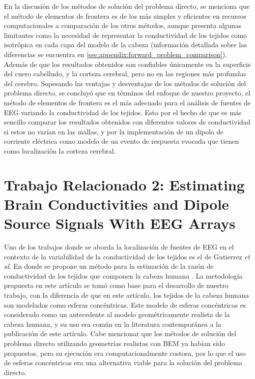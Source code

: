 En la discusión de los métodos de solución del problema directo, se menciona que el método de elementos de frontera es de los más simples y eficientes en recursos computacionales a comparación de los otros métodos, aunque presenta algunas limitantes como la necesidad de representar la conductividad de los tejidos como isotrópica en cada capa del modelo de la cabeza (información detallada sobre las diferencias se encuentra en \cref{sec:appendix:forward_problem_comparison}). Además de que los resultados obtenidos son confiables únicamente en la superficie del cuero cabelludo, y la corteza cerebral, pero no en las regiones más profundas del cerebro. Sopesando las ventajas y desventajas de los métodos de solución del problema directo, se concluyó que en términos del enfoque de nuestro proyecto, el método de elementos de frontera es el más adecuado para el análisis de fuentes de EEG variando la conductividad de los tejidos. Esto por el hecho de que es más sencillo  comparar los resultados obtenidos con diferentes valores de conductividad si estos no varían en las mallas, y por la implementación de un dipolo de corriente eléctrica como modelo de un evento de respuesta evocada que tienen como localización la corteza cerebral.

\section{Trabajo Relacionado 2: Estimating Brain Conductivities and Dipole Source Signals With EEG Arrays}
\label{sec:related:gutierrez}

Uno de los trabajos donde se aborda la localización de fuentes de EEG en el contexto de la variabilidad de la conductividad de los tejidos es el de Gutierrez \emph{et al}. En donde se propone un método para la estimación de la razón de conductividad de los tejidos que componen la cabeza humana \cite{Gutierrez2004}. La metodología propuesta en este artículo se tomó como base para el desarrollo de nuestro trabajo, con la diferencia de que en este artículo, los tejidos de la cabeza humana son modelados como esferas concéntricas. Este modelo de esferas concéntricas es considerado como un antecedente al modelo geométricamente realista de la cabeza humana, y su uso era común en la literatura contemporánea a la publicación de este artículo. Cabe mencionar que los métodos de solución del problema directo utilizando geometrías realistas con BEM ya habían sido propuestos, pero su ejecución era computacionalmente costosa, por lo que el uso de esferas concéntricas era una alternativa viable para la solución del problema directo.

